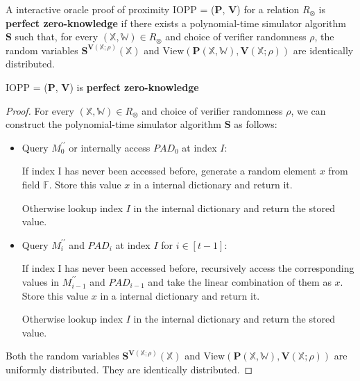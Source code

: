 \begin{definition}

A interactive oracle proof of proximity IOPP = ($\textbf{P}$, $\textbf{V}$) for a relation $R_\otimes$ is \textbf{perfect zero-knowledge} if there exists a polynomial-time simulator algorithm $\textbf{S}$ such that, for every $(\mathbb{X}, \mathbb{W}) \in R_\otimes$ and choice of verifier randomness $\rho$, the random variables $\textbf{S}^{\textbf{V}(\mathbb{X};\rho)}(\mathbb{X})$ and $\text{View}(\textbf{P}(\mathbb{X}, \mathbb{W}), \textbf{V}(\mathbb{X};\rho))$ are identically distributed.
 
\end{definition}

\begin{lemma}
\label{lemma:szkpc-zk}

IOPP = ($\textbf{P}$, $\textbf{V}$) is \textbf{perfect zero-knowledge}

\end{lemma}
\begin{proof}

For every $(\mathbb{X}, \mathbb{W}) \in R_\otimes$ and choice of verifier randomness $\rho$, we can construct the polynomial-time simulator algorithm $\textbf{S}$ as follows:

\begin{itemize}
    \item Query $M_0^{\prime\prime}$ or internally access $PAD_0$ at index $I$:
    
    If index I has never been accessed before, generate a random element $x$ from field $\mathbb{F}$. Store this value $x$ in a internal dictionary and return it.
    
    Otherwise lookup index $I$ in the internal dictionary and return the stored value.
    
    \item Query $M_i^{\prime\prime}$ and $PAD_i$ at index $I$ for $i \in [t-1]$:

    If index I has never been accessed before, recursively access the corresponding values in $M_{i-1}^{\prime\prime}$ and $PAD_{i-1}$ and take the linear combination of them as $x$.
    Store this value $x$ in a internal dictionary and return it.
    
    Otherwise lookup index $I$ in the internal dictionary and return the stored value.    
    
\end{itemize}

Both the random variables $\textbf{S}^{\textbf{V}(\mathbb{X};\rho)}(\mathbb{X})$ and $\text{View}(\textbf{P}(\mathbb{X}, \mathbb{W}), \textbf{V}(\mathbb{X};\rho))$ are uniformly distributed. They are identically distributed.

\end{proof}

